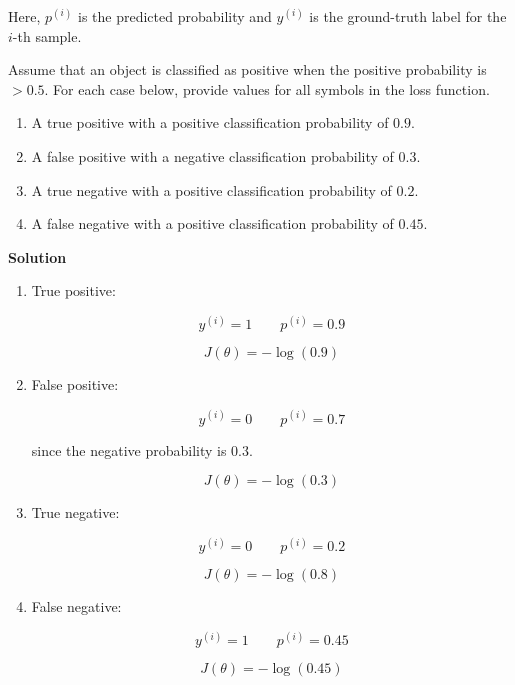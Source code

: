\documentclass[12pt]{article}
\begin{document}
	Here, \(p^{(i)}\) is the predicted probability and \(y^{(i)}\) is the ground-truth label for the \(i\)-th sample.
	
	Assume that an object is classified as positive when the positive probability is \(>0.5\). For each case below, provide values for all symbols in the loss function.
	
	\begin{enumerate}[itemsep=2pt]
		\item[(i)] A true positive with a positive classification probability of \(0.9\).
		
		\item[(ii)] A false positive with a negative classification probability of \(0.3\).
		
		\item[(iii)] A true negative with a positive classification probability of \(0.2\).
		
		\item[(iv)] A false negative with a positive classification probability of \(0.45\).
	\end{enumerate}
	
	\vspace{0.2cm}
	
	\noindent\textbf{Solution}
	
	\begin{enumerate}[itemsep=2pt]
		
		\item[(i)] True positive:
		
		\[
		y^{(i)}=1
		\qquad
		p^{(i)}=0.9
		\]
		
		\[
		J(\theta)=-\log(0.9)
		\]
		
		\item[(ii)] False positive:
		
		\[
		y^{(i)}=0
		\qquad
		p^{(i)}=0.7
		\]
		
		since the negative probability is \(0.3\).
		
		\[
		J(\theta)=-\log(0.3)
		\]
		
		\item[(iii)] True negative:
		
		\[
		y^{(i)}=0
		\qquad
		p^{(i)}=0.2
		\]
		
		\[
		J(\theta)=-\log(0.8)
		\]
		
		\item[(iv)] False negative:
		
		\[
		y^{(i)}=1
		\qquad
		p^{(i)}=0.45
		\]
		
		\[
		J(\theta)=-\log(0.45)
		\]
		
	\end{enumerate}
	
\end{document}
